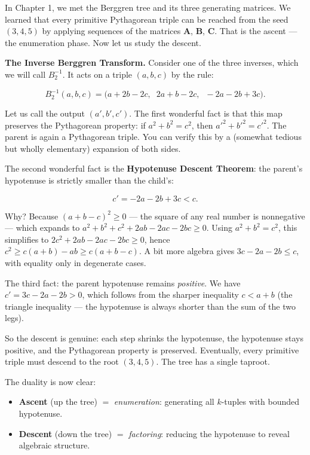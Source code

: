 In Chapter 1, we met the Berggren tree and its three generating matrices. We learned that every primitive Pythagorean triple can be reached from the seed $(3, 4, 5)$ by applying sequences of the matrices $\mathbf{A}$, $\mathbf{B}$, $\mathbf{C}$. That is the ascent --- the enumeration phase. Now let us study the descent.

\textbf{The Inverse Berggren Transform.} Consider one of the three inverses, which we will call $B_2^{-1}$. It acts on a triple $(a, b, c)$ by the rule:

\[
B_2^{-1}(a, b, c) = \big(a + 2b - 2c,\;\; 2a + b - 2c,\;\; -2a - 2b + 3c\big).
\]

Let us call the output $(a', b', c')$. The first wonderful fact is that this map preserves the Pythagorean property: if $a^2 + b^2 = c^2$, then $a'^2 + b'^2 = c'^2$. The parent is again a Pythagorean triple. You can verify this by a (somewhat tedious but wholly elementary) expansion of both sides.

The second wonderful fact is the \textbf{Hypotenuse Descent Theorem}: the parent's hypotenuse is strictly smaller than the child's:

\[
c' = -2a - 2b + 3c < c.
\]

Why? Because $(a + b - c)^2 \geq 0$ --- the square of any real number is nonnegative --- which expands to $a^2 + b^2 + c^2 + 2ab - 2ac - 2bc \geq 0$. Using $a^2 + b^2 = c^2$, this simplifies to $2c^2 + 2ab - 2ac - 2bc \geq 0$, hence $c^2 \geq c(a + b) - ab \geq c(a + b - c)$. A bit more algebra gives $3c - 2a - 2b \leq c$, with equality only in degenerate cases.

The third fact: the parent hypotenuse remains \textit{positive}. We have $c' = 3c - 2a - 2b > 0$, which follows from the sharper inequality $c < a + b$ (the triangle inequality --- the hypotenuse is always shorter than the sum of the two legs).

So the descent is genuine: each step shrinks the hypotenuse, the hypotenuse stays positive, and the Pythagorean property is preserved. Eventually, every primitive triple must descend to the root $(3, 4, 5)$. The tree has a single taproot.

The duality is now clear:

\begin{itemize}[leftmargin=*]
\item \textbf{Ascent} (up the tree) $=$ \textit{enumeration}: generating all $k$-tuples with bounded hypotenuse.
\item \textbf{Descent} (down the tree) $=$ \textit{factoring}: reducing the hypotenuse to reveal algebraic structure.
\end{itemize}

